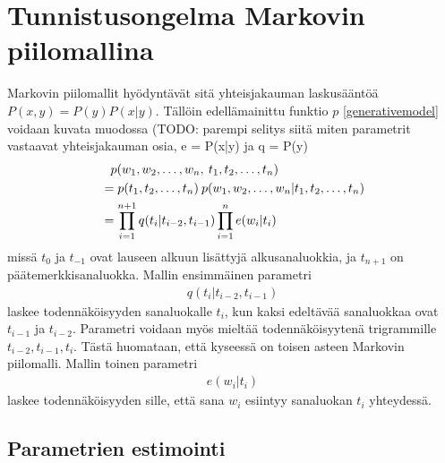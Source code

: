 \documentclass[utf8,bachelor,manualbib]{gradu3}
\begin{document}
\section{Tunnistusongelma Markovin piilomallina}

Markovin piilomallit hyödyntävät sitä yhteisjakauman laskusääntöä $P(x,y) = P(y)P(x|y)$. Tällöin edellämainittu funktio $ p $ \eqref{generativemodel} voidaan kuvata muodossa (TODO: parempi selitys siitä miten parametrit vastaavat yhteisjakauman osia, e = P(x|y) ja q = P(y)
\begin{align}
& \hphantom{= } p(w_1, w_2, \ldots, w_n,\: t_1, t_2, \ldots, t_n) \\
& = p(t_1, t_2, \ldots, t_n)\:p(w_1, w_2, \ldots, w_n|t_1, t_2, \ldots, t_n) \\
& = \prod_{i=1}^{n+1} q(t_i | t_{i-2}, t_{i-1}) \prod_{i=1}^{n}e(w_i | t_i)
\end{align}
missä $t_0$ ja $t_{-1}$ ovat lauseen alkuun lisättyjä alkusanaluokkia, ja $t_{n+1}$ on päätemerkkisanaluokka. Mallin ensimmäinen parametri
\begin{align}
q(t_i | t_{i-2}, t_{i-1})
\end{align}
laskee todennäköisyyden sanaluokalle $t_i$, kun kaksi edeltävää sanaluokkaa ovat $t_{i-1}$ ja $t_{i-2}$. Parametri voidaan myös mieltää todennäköisyytenä trigrammille $t_{i-2}, t_{i-1}, t_i $. Tästä huomataan, että kyseessä on toisen asteen Markovin piilomalli. Mallin toinen parametri
\begin{align}
e(w_i | t_i)
\end{align}
laskee todennäköisyyden sille, että sana $w_i$ esiintyy sanaluokan $t_i$ yhteydessä.

\subsection{Parametrien estimointi}
\end{document}
